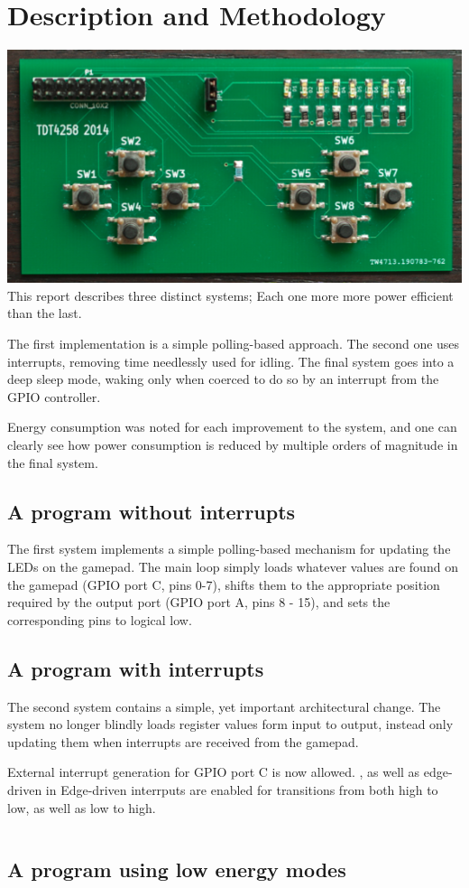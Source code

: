 \section{Description and Methodology}

\includegraphics{figures/gamepad.png}
This report describes three distinct systems; Each one more more power efficient than the last.

The first implementation is a simple polling-based approach. The second one uses interrupts, removing time needlessly used for idling. The final system goes into a deep sleep mode, waking only when coerced to do so by an interrupt from the GPIO controller.

Energy consumption was noted for each improvement to the system, and one can clearly see how power consumption is reduced by multiple orders of magnitude in the final system.

\subsection{A program without interrupts}

The first system implements a simple polling-based mechanism for updating the LEDs on the gamepad. The main loop simply loads whatever values are found on the gamepad (GPIO port C, pins 0-7), shifts them to the appropriate position required by the output port (GPIO port A, pins 8 - 15), and sets the corresponding pins to logical low.

\subsection{A program with interrupts}

The second system contains a simple, yet important architectural change. The system no longer blindly loads register values form input to output, instead only updating them when interrupts are received from the gamepad.

External interrupt generation for GPIO port C is now allowed. , as well as edge-driven in
Edge-driven interrputs are enabled for transitions from both high to low, as well as low to high.

\begin{lstlisting}
\end{lstlisting}


\subsection{A program using low energy modes}
